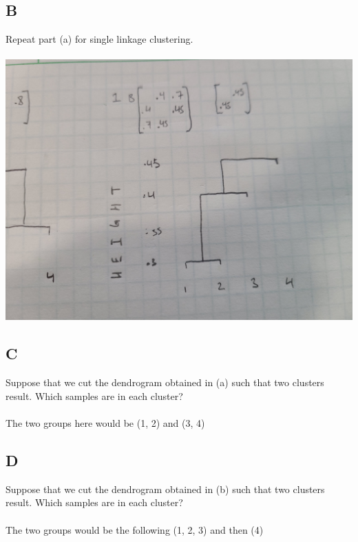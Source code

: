 \documentclass[12pt]{article}
\begin{document}
\subsection{B}
Repeat part (a) for single linkage clustering.\\\\
\includegraphics[width=1\textwidth]{p1.b.jpg}


\subsection{C}
Suppose that we cut the dendrogram obtained in (a) such that two clusters result. Which samples are in each cluster?\\\\
The two groups here would be (1, 2) and (3, 4)


\subsection{D}
Suppose that we cut the dendrogram obtained in (b) such that two clusters result. Which samples are in each cluster?\\\\
The two groups would be the following (1, 2, 3) and then (4)
\end{document}
